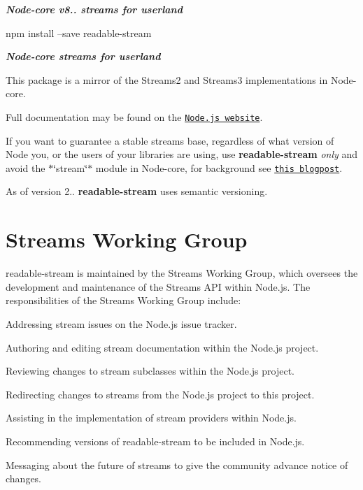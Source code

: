 {\itshape {\bfseries Node-\/core v8.. streams for userland}} \href{https://travis-ci.org/nodejs/readable-stream}{\tt }

\href{https://nodei.co/npm/readable-stream/}{\tt } \href{https://nodei.co/npm/readable-stream/}{\tt }

\href{https://saucelabs.com/u/readable-stream}{\tt }


\begin{DoxyCode}
npm install --save readable-stream
\end{DoxyCode}


{\itshape {\bfseries Node-\/core streams for userland}}

This package is a mirror of the Streams2 and Streams3 implementations in Node-\/core.

Full documentation may be found on the \href{https://nodejs.org/dist/v8.11.1/docs/api/stream.html}{\tt Node.\+js website}.

If you want to guarantee a stable streams base, regardless of what version of Node you, or the users of your libraries are using, use {\bfseries readable-\/stream} {\itshape only} and avoid the $\ast$\char`\"{}stream\char`\"{}$\ast$ module in Node-\/core, for background see \href{http://r.va.gg/2014/06/why-i-dont-use-nodes-core-stream-module.html}{\tt this blogpost}.

As of version 2.. {\bfseries readable-\/stream} uses semantic versioning.

\section*{Streams Working Group}

{\ttfamily readable-\/stream} is maintained by the Streams Working Group, which oversees the development and maintenance of the Streams A\+PI within Node.\+js. The responsibilities of the Streams Working Group include\+:


\begin{DoxyItemize}
\item Addressing stream issues on the Node.\+js issue tracker.
\item Authoring and editing stream documentation within the Node.\+js project.
\item Reviewing changes to stream subclasses within the Node.\+js project.
\item Redirecting changes to streams from the Node.\+js project to this project.
\item Assisting in the implementation of stream providers within Node.\+js.
\item Recommending versions of {\ttfamily readable-\/stream} to be included in Node.\+js.
\item Messaging about the future of streams to give the community advance notice of changes.
\end{DoxyItemize}

